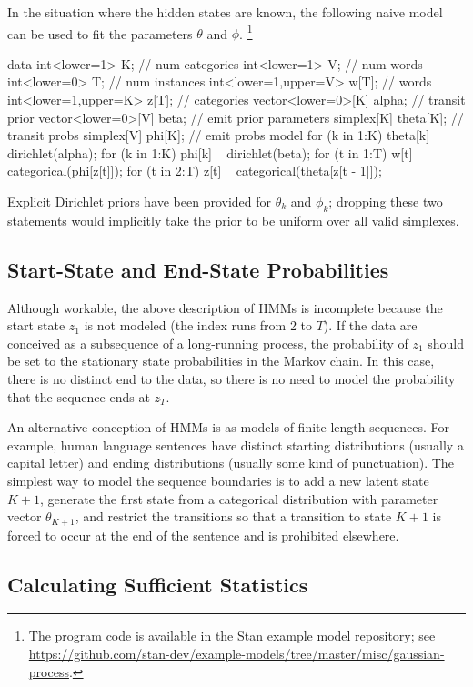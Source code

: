 In the situation where the hidden states are known, the following
naive model can be used to fit the parameters $\theta$ and $\phi$.%
%
\footnote{The program code is available in the Stan example model repository;
see \url{https://github.com/stan-dev/example-models/tree/master/misc/gaussian-process}.}
%
\begin{stancode}
data {
  int<lower=1> K;  // num categories
  int<lower=1> V;  // num words
  int<lower=0> T;  // num instances
  int<lower=1,upper=V> w[T]; // words
  int<lower=1,upper=K> z[T]; // categories
  vector<lower=0>[K] alpha;  // transit prior
  vector<lower=0>[V] beta;   // emit prior
}
parameters {
  simplex[K] theta[K];  // transit probs
  simplex[V] phi[K];    // emit probs
}
model {
  for (k in 1:K) 
    theta[k] ~ dirichlet(alpha);
  for (k in 1:K)
    phi[k] ~ dirichlet(beta);
  for (t in 1:T)
    w[t] ~ categorical(phi[z[t]]);
  for (t in 2:T)
    z[t] ~ categorical(theta[z[t - 1]]);
}
\end{stancode}
%
Explicit Dirichlet priors have been provided for $\theta_k$ and
$\phi_k$; dropping these two statements would implicitly take the
prior to be uniform over all valid simplexes.

\subsection{Start-State and End-State Probabilities}

Although workable, the above description of HMMs is incomplete because
the start state $z_1$ is not modeled (the index runs from 2 to $T$).
If the data are conceived as a subsequence of a long-running process,
the probability of $z_1$ should be set to the stationary state
probabilities in the Markov chain.  In this case, there is no distinct
end to the data, so there is no need to model the probability that the
sequence ends at $z_T$.  

An alternative conception of HMMs is as models of finite-length
sequences.  For example, human language sentences have distinct
starting distributions (usually a capital letter) and ending
distributions (usually some kind of punctuation).  The simplest way to
model the sequence boundaries is to add a new latent state $K+1$,
generate the first state from a categorical distribution with
parameter vector $\theta_{K+1}$, and restrict the transitions so that
a transition to state $K+1$ is forced to occur at the end of the
sentence and is prohibited elsewhere.

\subsection{Calculating Sufficient Statistics}

